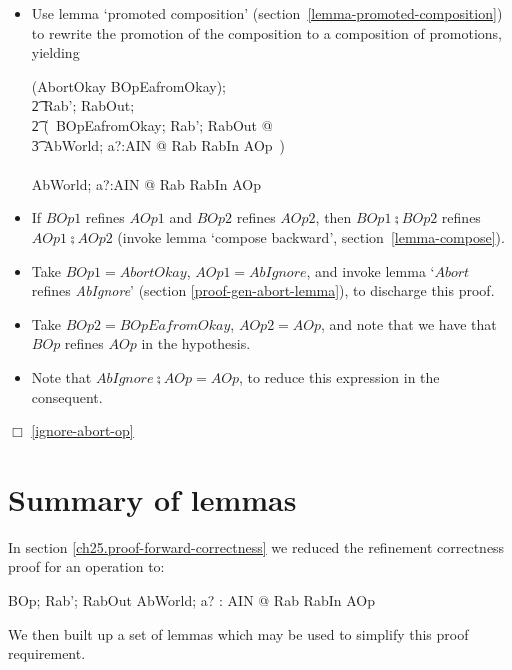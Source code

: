 \begin{itemize}
\item Use lemma `promoted composition'
  (section~\ref{lemma-promoted-composition}) to rewrite the promotion
  of the composition to a composition of promotions, yielding
  \begin{gzed}
  (AbortOkay \semi BOpEafromOkay);
  \\ %
  \t2 Rab'; RabOut;
  \\ %
  \t2 (~\forall BOpEafromOkay; Rab'; RabOut @
  \\ %
  \t3 \exists AbWorld; a?:AIN @ Rab \land RabIn \land AOp~)
  \\ %
  \shows
  \\ %
  \exists AbWorld; a?:AIN @ Rab \land RabIn \land AOp
  \end{gzed}

\item If $BOp1$ refines $AOp1$ and $BOp2$ refines $AOp2$, then $BOp1
  \semi BOp2$ refines $AOp1 \semi AOp2$ (invoke lemma `compose
  backward', section~\ref{lemma-compose}).
\item Take $BOp1 = AbortOkay$, $AOp1 = AbIgnore$, and invoke lemma
  `$Abort$ refines {\it AbIgnore}' (section
  \ref{proof-gen-abort-lemma}), to discharge this proof.
\item Take $BOp2 = BOpEafromOkay$, $AOp2 = AOp$, and note that we
  have that $BOp$ refines $AOp$ in the hypothesis.
\item Note that $AbIgnore \semi AOp = AOp$, to reduce this
  expression in the consequent.
\end{itemize}

$\Box$ \ref{ignore-abort-op}
\section{Summary of lemmas}
In section \ref{ch25.proof-forward-correctness} we reduced the refinement correctness
proof for an operation to:
\begin{gzed}
  BOp; Rab'; RabOut
  \shows \exists AbWorld; a? : AIN @ Rab \land RabIn \land AOp
\end{gzed}
We then built up a set of lemmas which may be used to simplify this
proof requirement.

